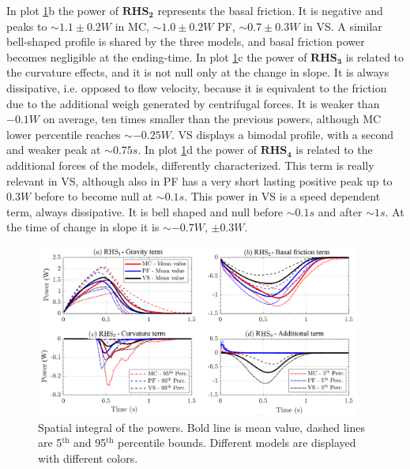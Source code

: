 \documentclass{article}
\begin{document}
In plot \ref{fig:Ramp-Power-spatial}b the power of  $\boldsymbol{RHS_2}$ represents the basal friction. It is negative and peaks to $\sim 1.1 \pm 0.2 W$ in MC, $\sim 1.0 \pm 0.2 W$ PF, $\sim 0.7 \pm 0.3 W$ in VS. A similar bell-shaped profile is shared by the three models, and basal friction power becomes negligible at the ending-time. In plot \ref{fig:Ramp-Power-spatial}c the power of $\boldsymbol{RHS_3}$ is related to the curvature effects, and it is not null only at the change in slope. It is always dissipative, i.e. opposed to flow velocity, because it is equivalent to the friction due to the additional weigh generated by centrifugal forces. It is weaker than $-0.1 W$ on average, ten times smaller than the previous powers, although MC lower percentile reaches $\sim -0.25 W$. VS displays a bimodal profile, with a second and weaker peak at $\sim 0.75 s$. In plot \ref{fig:Ramp-Power-spatial}d the power of $\boldsymbol{RHS_4}$ is related to the additional forces of the models, differently characterized. This term is really relevant in VS, although also in PF has a very short lasting positive peak up to $0.3 W$ before to become null at $\sim 0.1 s$. This power in VS is a speed dependent term, always dissipative. It is bell shaped and null before $\sim 0.1 s$ and after $\sim 1 s$. At the time of change in slope it is $\sim -0.7 W$, $\pm 0.3 W$.
\begin{figure}[H]
        \centering
        \includegraphics[width=0.95\textwidth]{figures/incline/PowersIncline.png}
        \caption{Spatial integral of the powers. Bold line is mean value, dashed lines are 5$^{\mathrm{th}}$ and 95$^{\mathrm{th}}$ percentile bounds. Different models are displayed with different colors.}
        \label{fig:Ramp-Power-spatial}
\end{figure}
\end{document}
